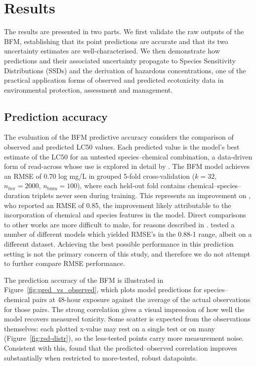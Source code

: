 \section{Results}

The results are presented in two parts. We first validate the raw outputs of the BFM, establishing that its point predictions are accurate and that its two uncertainty estimates are well-characterised. We then demonstrate how predictions and their associated uncertainty propagate to Species Sensitivity Distributions (SSDs) and the derivation of hazardous concentrations, one of the practical application forms of observed and predicted ecotoxicity data in environmental protection, assessment and management.

\subsection{Prediction accuracy}
The evaluation of the BFM predictive accuracy considers the comparison of observed and predicted LC50 values. Each predicted value is the model's best estimate of the LC50 for an untested species--chemical combination, a data-driven form of read-across whose use is explored in detail by \citet{PosthumaImprovingHazard}. The BFM model achieves an RMSE of 0.70 log mg/L in grouped 5-fold cross-validation ($k=32$, $n_{\text{iter}}=2000$, $n_{\text{burn}}=100$), where each held-out fold contains chemical--species--duration triplets never seen during training. This represents an improvement on \citet{PosthumaImprovingHazard}, who reported an RMSE of 0.85, the improvement likely attributable to the incorporation of chemical and species features in the model. Direct comparisons to other works are more difficult to make, for reasons described in  \citet{schur2025comparability}. \citet{Viljanen2023} tested a number of different models which yielded RMSE's in the 0.88-1 range, albeit on a different dataset. Achieving the best possible performance in this prediction setting is not the primary concern of this study, and therefore we do not attempt to further compare RMSE performance. 

The prediction accuracy of the BFM is illustrated in Figure~\ref{fig:pred_vs_observed}, which plots model predictions for species--chemical pairs at 48-hour exposure against the average of the actual observations for those pairs. The strong correlation gives a visual impression of how well the model recovers measured toxicity. Some scatter is expected from the observations themselves: each plotted x-value may rest on a single test or on many (Figure~\ref{fig:rsd-distr}), so the less-tested points carry more measurement noise. Consistent with this, \citet{PosthumaImprovingHazard} found that the predicted--observed correlation improves substantially when restricted to more-tested, robust datapoints.

